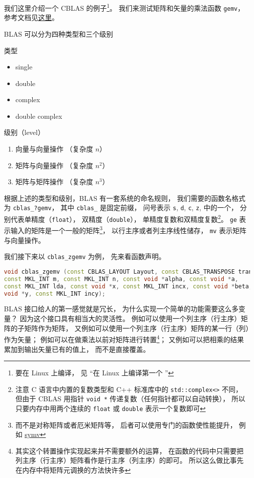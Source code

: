 我们这里介绍一个 CBLAS 的例子\footnote{要在 Linux 上编译， 见 “在 Linux 上编译第一个 ”}。 我们来测试矩阵和矢量的乘法函数 \verb|gemv|， 参考文档见\href{https://software.intel.com/en-us/node/834919#88940C4E-0889-46C3-B6CF-F8B6EA6CF4BC}{这里}。

BLAS 可以分为四种类型和三个级别

类型
\begin{itemize}
    \item single
    \item double
    \item complex
    \item double complex
\end{itemize}

级别（level）
\begin{enumerate}
    \item 向量与向量操作 （复杂度 $n$）
    \item 矩阵与向量操作 （复杂度 $n^2$）
    \item 矩阵与矩阵操作 （复杂度 $n^3$）
\end{enumerate}

根据上述的类型和级别，BLAS 有一套系统的命名规则，
我们需要的函数名格式为 \verb|cblas_?gemv|， 其中 \verb|cblas_| 是固定前缀， 问号表示 \verb|s|, \verb|d|, \verb|c|, \verb|z|, 中的一个， 分别代表单精度（\verb|float|）， 双精度（\verb|double|）， 单精度复数和双精度复数\footnote{注意 C 语言中内置的复数类型和 C++ 标准库中的 \lstinline|std::complex<>| 不同， 但由于 CBLAS 用指针 \lstinline|void *| 传递复数（任何指针都可以自动转换）， 所以只要内存中用两个连续的 \lstinline|float| 或 \lstinline|double| 表示一个复数即可}。 \verb|ge| 表示输入的矩阵是一个一般的矩阵\footnote{而不是对称矩阵或者厄米矩阵等， 后者可以使用专门的函数使性能提升， 例如 \href{https://software.intel.com/en-us/node/834934}{symv}}， 以行主序或者列主序线性储存， \lstinline|mv| 表示矩阵与向量操作。 

我们接下来以 \verb|cblas_zgemv| 为例， 先来看函数声明。
\begin{lstlisting}[language=cpp]
void cblas_zgemv (const CBLAS_LAYOUT Layout, const CBLAS_TRANSPOSE trans,
const MKL_INT m, const MKL_INT n, const void *alpha, const void *a,
const MKL_INT lda, const void *x, const MKL_INT incx, const void *beta,
void *y, const MKL_INT incy);
\end{lstlisting}

BLAS 接口给人的第一感觉就是冗长， 为什么实现一个简单的功能需要这么多变量？ 因为这个接口具有相当大的灵活性。 例如可以使用一个列主序（行主序）矩阵的子矩阵作为矩阵， 又例如可以使用一个列主序（行主序）矩阵的某一行（列）作为矢量； 例如可以在做乘法以前对矩阵进行转置\footnote{其实这个转置操作实现起来并不需要额外的运算， 在函数的代码中只需要把列主序（行主序）矩阵看作是行主序（列主序）的即可。 所以这么做比事先在内存中将矩阵元调换的方法快许多}； 又例如可以把相乘的结果累加到输出矢量已有的值上， 而不是直接覆盖。

